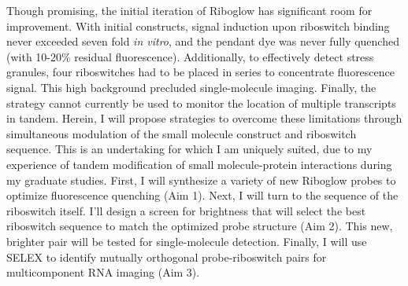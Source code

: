 Though promising, the initial iteration of Riboglow has significant room for improvement. With initial constructs, signal induction upon riboswitch binding never exceeded seven fold \textit{in vitro}, and the pendant dye was never fully quenched (with 10-20\% residual fluorescence). Additionally, to effectively detect stress granules, four riboswitches had to be placed in series to concentrate fluorescence signal. This high background precluded single-molecule imaging. Finally, the strategy cannot currently be used to monitor the location of multiple transcripts in tandem. Herein, I will propose strategies to overcome these limitations through simultaneous modulation of the small molecule construct and riboswitch sequence. This is an undertaking for which I am uniquely suited, due to my experience of tandem modification of small molecule-protein interactions during my graduate studies. First, I will synthesize a variety of new Riboglow probes to optimize fluorescence quenching (Aim 1). Next, I will turn to the sequence of the riboswitch itself. I'll design a screen for brightness that will select the best riboswitch sequence to match the optimized probe structure (Aim 2). This new, brighter pair will be tested for single-molecule detection. Finally, I will use SELEX to identify mutually orthogonal probe-riboswitch pairs for multicomponent RNA imaging (Aim 3).


